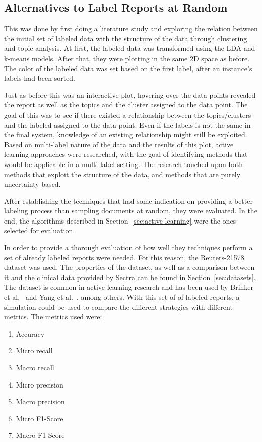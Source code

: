 \subsection{Alternatives to Label Reports at Random}\label{sec:exp2-method}

This was done by first doing a literature study and exploring the relation between the initial set of labeled data with the structure of the data through clustering and topic analysis.
At first, the labeled data was transformed using the LDA and k-means models.
After that, they were plotting in the same 2D space as before.
The color of the labeled data was set based on the first label, after an instance's labels had been sorted.

Just as before this was an interactive plot, hovering over the data points revealed the report as well as the topics and the cluster assigned to the data point.
The goal of this was to see if there existed a relationship between the topics/clusters and the labeled assigned to the data point.
Even if the labels is not the same in the final system, knowledge of an existing relationship might still be exploited.
Based on multi-label nature of the data and the results of this plot, active learning approaches were researched, with the goal of identifying methods that would be applicable in a multi-label setting.
The research touched upon both methods that exploit the structure of the data, and methods that are purely uncertainty based.

After establishing the techniques that had some indication on providing a better labeling process than sampling documents at random, they were evaluated.
In the end, the algorithms described in Section~\ref{sec:active-learning} were the ones selected for evaluation.

In order to provide a thorough evaluation of how well they techniques perform a set of already labeled reports were needed.
For this reason, the Reuters-21578 dataset was used.
The properties of the dataset, as well as a comparison between it and the clinical data provided by Sectra can be found in Section~\ref{sec:datasets}.
The dataset is common in active learning research and has been used by Brinker et al\@.~\cite{brinker2006active} and Yang et al\@.~\cite{yang2009effective}, among others.
With this set of of labeled reports, a simulation could be used to compare the different strategies with different metrics.
The metrics used were:
\begin{enumerate}
    \item Accuracy
    \item Micro recall
    \item Macro recall
    \item Micro precision
    \item Macro precision
    \item Micro F1-Score
    \item Macro F1-Score
\end{enumerate}

